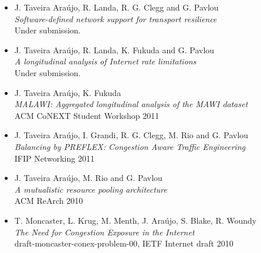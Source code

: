 \begin{itemize}
    \item J. Taveira Ara\'{u}jo, R. Landa, R. G. Clegg and G. Pavlou \\
            \emph{Software-defined network support for transport resilience} \\
            Under submission.
    \item J. Taveira Ara\'{u}jo, R. Landa, K. Fukuda and G. Pavlou \\
            \emph{A longitudinal analysis of Internet rate limitations} \\
            Under submission.
    \item J. Taveira Ara\'{u}jo, K. Fukuda \\
            \emph{MALAWI: Aggregated longitudinal analysis of the MAWI dataset} \\
            {ACM CoNEXT Student Workshop 2011}
    \item J. Taveira Ara\'{u}jo, I. Grandi, R. G. Clegg, M. Rio and G. Pavlou \\
            \emph{Balancing by PREFLEX: Congestion Aware Traffic Engineering} \\
            {IFIP Networking 2011}
    \item J. Taveira Ara\'{u}jo, M. Rio and G. Pavlou \\
        \emph{A mutualistic resource pooling architecture} \\
        {ACM ReArch 2010}
    \item T. Moncaster, L. Krug, M. Menth, J. Ara\'{u}jo, S. Blake, R. Woundy \\
        \emph{The Need for Congestion Exposure in the Internet} \\
        {draft-moncaster-conex-problem-00, IETF Internet draft 2010}
\end{itemize}

